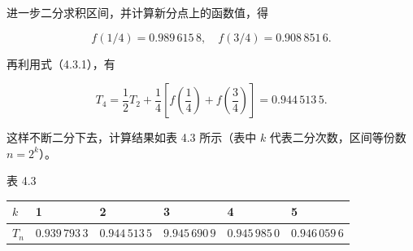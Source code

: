\documentclass[
  10pt,
  fontset=fandol]{ctexart}
\newcounter{none} %
\begin{document}
进一步二分求积区间，并计算新分点上的函数值，得

\[
f(1/4)=0.989\,615\,8,\quad f(3/4)=0.908\,851\,6.
\]

再利用式（4.3.1），有

\[
T_4=\frac12T_2+\frac14\left[f\left(\frac14\right)+f\left(\frac34\right)\right]=0.944\,513\,5.
\]

这样不断二分下去，计算结果如表 4.3 所示（表中 \(k\) 代表二分次数，区间等份数 \(n=2^k\)）。

表 4.3

{\def\LTcaptype{none} %
\begin{longtable}[]{@{}
  >{\raggedright\arraybackslash}p{}
  >{\raggedright\arraybackslash}p{}
  >{\raggedright\arraybackslash}p{}
  >{\raggedright\arraybackslash}p{}
  >{\raggedright\arraybackslash}p{}
  >{\raggedright\arraybackslash}p{}@{}}
\toprule\noalign{}
\begin{minipage}[b]{\linewidth}\raggedright
\(k\)
\end{minipage} & \begin{minipage}[b]{\linewidth}\raggedright
1
\end{minipage} & \begin{minipage}[b]{\linewidth}\raggedright
2
\end{minipage} & \begin{minipage}[b]{\linewidth}\raggedright
3
\end{minipage} & \begin{minipage}[b]{\linewidth}\raggedright
4
\end{minipage} & \begin{minipage}[b]{\linewidth}\raggedright
5
\end{minipage} \\
\midrule\noalign{}
\endhead
\bottomrule\noalign{}
\endlastfoot
\(T_n\) & \(0.939\,793\,3\) & \(0.944\,513\,5\) & \(9.945\,690\,9\) & \(0.945\,985\,0\) & \(0.946\,059\,6\) \\
\end{longtable}
}
\end{document}
